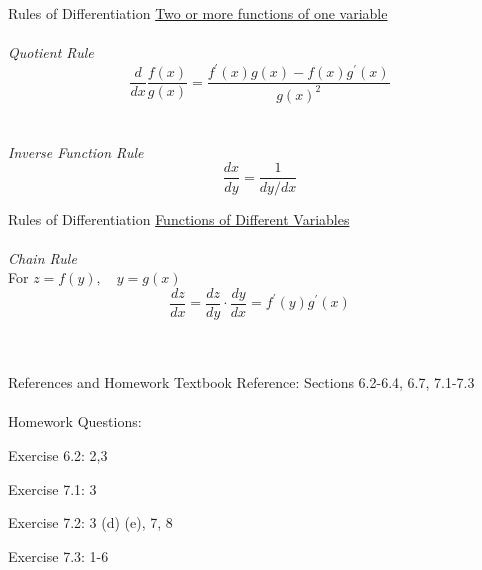 \documentclass{./../../Latex/teaching_slides}
\begin{document}
\begin{frame}{Rules of Differentiation}
\underline{Two or more functions of one variable} \\~\\ 
\textit{Quotient Rule}\\
$$ \frac{d}{d x} \frac{f(x)}{g(x)}=\frac{f^{\prime}(x) g(x)-f(x) g^{\prime}(x)}{g(x)^2} $$\\~\\
\textit{Inverse Function Rule}
$$
\frac{d x}{d y}=\frac{1}{d y / d x}
$$

\end{frame}


\begin{frame}{Rules of Differentiation}
\underline{Functions of Different Variables} \\~\\
\textit{Chain Rule} \\
\vspace{0.5em}
For \( z=f(y), \quad y=g(x) \)
$$ \frac{d z}{d x}=\frac{d z}{d y} \cdot \frac{d y}{d x}=f^{\prime}(y) g^{\prime}(x) $$ \\~\\
\end{frame}

\begin{frame}{References and Homework}
Textbook Reference: Sections 6.2-6.4, 6.7, 7.1-7.3 \\~\\
Homework Questions: \\ \vspace{0.5em}
\begin{witemize}
  \item Exercise 6.2: 2,3
  \item Exercise 7.1: 3
  \item Exercise 7.2: 3 (d) (e), 7, 8
  \item Exercise 7.3: 1-6
\end{witemize}
\end{frame}
\end{document}
